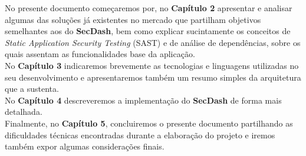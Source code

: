 No presente documento começaremos por, no \textbf{Capítulo 2} apresentar e analisar algumas das soluções já existentes no mercado que partilham objetivos semelhantes aos do \textbf{SecDash}, bem como explicar sucintamente os conceitos de \textit{Static Application Security Testing} (SAST) e de análise de dependências, sobre os quais assentam as funcionalidades base da aplicação. \\

No \textbf{Capítulo 3} indicaremos brevemente as tecnologias e linguagens utilizadas no seu desenvolvimento e apresentaremos também um resumo simples da arquitetura que a sustenta. \\

No \textbf{Capítulo 4} descreveremos a implementação do \textbf{SecDash} de forma mais detalhada. \\

Finalmente, no \textbf{Capítulo 5}, concluiremos o presente documento partilhando as dificuldades técnicas encontradas durante a elaboração do projeto e iremos também expor algumas considerações finais. \\